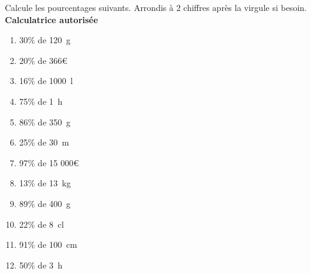 %
%
	Calcule les pourcentages suivants. Arrondis à 2 chiffres après la virgule si besoin. \\ \textbf{Calculatrice autorisée}
	\begin{enumerate}[cols=4]
		\item 30\% de \SI{120}{g}
		\item 20\% de 366€
		\item 16\% de \SI{1000}{l}
		\item 75\% de \SI{1}{h}
		\item 86\% de \SI{350}{g}
		\item 25\% de \SI{30}{m}
		\item 97\% de 15 000€
		\item 13\% de \SI{13}{kg}
		\item 89\% de \SI{400}{g}
		\item 22\% de \SI{8}{cl}
		\item 91\% de \SI{100}{cm}
		\item 50\% de \SI{3}{h}
	\end{enumerate}
